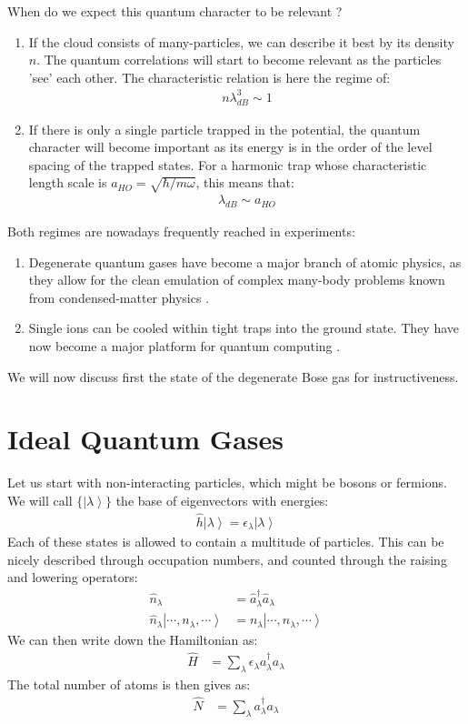 \documentclass[10pt]{article}
\let\cite\citep
\providecommand\citep{\cite}
\newcommand{\ket}[1]{\ensuremath{\left|#1\right\rangle}}
\begin{document}
When do we expect this quantum character to be relevant ?
\begin{enumerate}
\item If the cloud consists of many-particles, we can describe it best by its density $n$. The quantum correlations will start to become relevant as the particles 'see' each other. The characteristic relation is here the regime of:
\begin{align}
n\lambda_{dB}^3\sim 1
\end{align}
\item If there is only a single particle trapped in the potential, the quantum character will become important as its energy is in the order of the level spacing of the trapped states. For a harmonic trap whose characteristic length scale is $a_{HO}=\sqrt{\hbar/m\omega}$, this means that:
\begin{align}
\lambda_{dB}\sim a_{HO}
\end{align}
\end{enumerate}
Both regimes are nowadays frequently reached in experiments:
\begin{enumerate}
\item Degenerate quantum gases have become a major branch of atomic physics, as they allow for the clean emulation of complex many-body problems known from condensed-matter physics \cite{Bloch_2008}.
\item Single ions can be cooled within tight traps into the ground state. They have now become a major platform for quantum computing \cite{Leibfried_2003}.
\end{enumerate}

We will now discuss first the state of the degenerate Bose gas for instructiveness.

\section{Ideal Quantum Gases}
Let us start with non-interacting particles, which might be bosons or fermions. We will call $\{\ket{\lambda}\}$ the base of eigenvectors with energies:
\begin{align}
\hat{h}\ket{\lambda}=\epsilon_\lambda \ket{\lambda}
\end{align}
Each of these states is allowed to contain a multitude of particles. This can be nicely described through occupation numbers, and counted through the raising and lowering operators:
\begin{align}
\hat{n}_\lambda &= \hat{a}^\dag_\lambda \hat{a}_\lambda\\
\hat{n}_\lambda \ket{\cdots, n_\lambda, \cdots} &= n_\lambda \ket{\cdots, n_\lambda, \cdots}
\end{align}
We can then write down the Hamiltonian as:
\begin{align}
\hat{H} &= \sum_\lambda \epsilon_\lambda a_\lambda^\dag a_\lambda
\end{align}
The total number of atoms is then gives as:
\begin{align}
\hat{N} &= \sum_\lambda  a_\lambda^\dag a_\lambda
\end{align}
\end{document}
